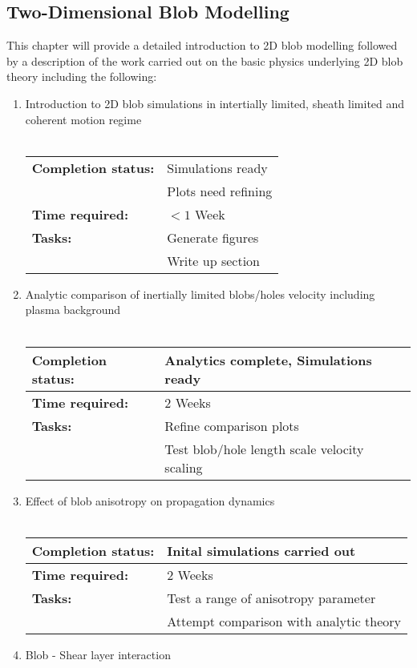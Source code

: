 \documentclass[11pt]{article}
\begin{document}
\subsection{Two-Dimensional Blob Modelling}
This chapter will provide a detailed introduction to 2D blob modelling followed by a description of the work carried out on the basic physics underlying 2D blob theory including the following:
\begin{enumerate}
\item Introduction to 2D blob simulations in intertially limited, sheath limited and coherent motion regime\\ \\
\begin{tabular}{l l}
\hline
\textbf{Completion status:} &  Simulations ready \\
 & Plots need refining \\
\hline
\textbf{Time required:} & $< 1$ Week \\
\hline
\textbf{Tasks:}  & Generate figures \\
 & Write up section
\end{tabular}
\item Analytic comparison of inertially limited blobs/holes velocity including plasma background \\ \\
\begin{tabular}{l l}
\hline
\textbf{Completion status:} &  Analytics complete, Simulations ready \\
\hline
\textbf{Time required:} & 2 Weeks \\
\hline
\textbf{Tasks:}  & Refine comparison plots \\
 & Test blob/hole length scale velocity scaling
\end{tabular}
\item Effect of blob anisotropy on propagation dynamics\\ \\
\begin{tabular}{l l}
\hline
\textbf{Completion status:} &  Inital simulations carried out \\
\hline
\textbf{Time required:} & 2 Weeks \\
\hline
\textbf{Tasks:}  & Test a range of anisotropy parameter \\
 & Attempt comparison with analytic theory
\end{tabular}
\item Blob - Shear layer interaction\\ \\

\end{enumerate}
\end{document}
